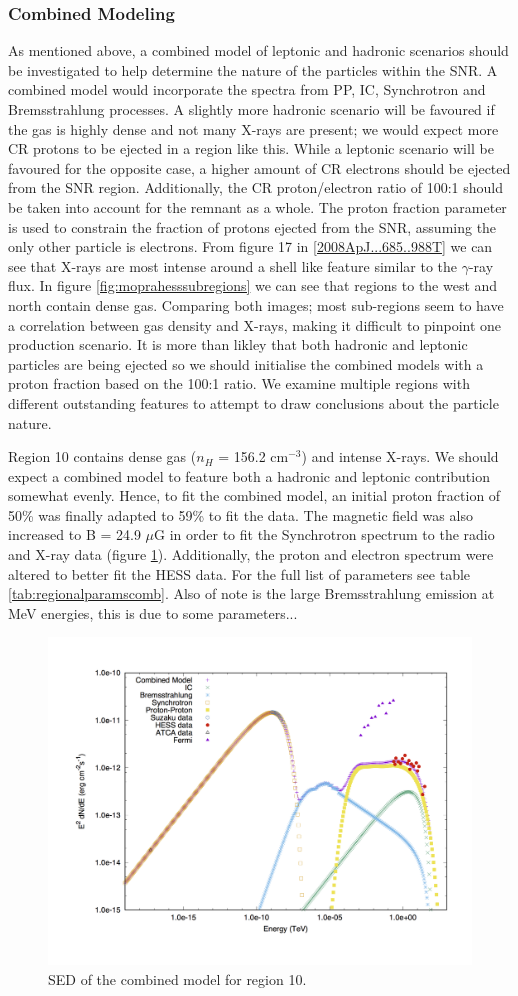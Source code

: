 \documentclass[12pt,a4paper]{article}
\begin{document}
\subsubsection{Combined Modeling}
As mentioned above, a combined model of leptonic and hadronic scenarios should be investigated to help determine the nature of the particles within the SNR. A combined model would incorporate the spectra from PP, IC, Synchrotron and Bremsstrahlung processes. A slightly more hadronic scenario will be favoured if the gas is highly dense and not many X-rays are present; we would expect more CR protons to be ejected in a region like this. While a leptonic scenario will be favoured for the opposite case, a higher amount of CR electrons should be ejected from the SNR region. Additionally, the CR proton/electron ratio of 100:1 should be taken into account for the remnant as a whole. The proton fraction parameter is used to constrain the fraction of protons ejected from the SNR, assuming the only other particle is electrons. From figure 17 in \ref{2008ApJ...685..988T} we can see that X-rays are most intense around a shell like feature similar to the $\gamma$-ray flux. In figure \ref{fig:moprahesssubregions} we can see that regions to the west and north contain dense gas. Comparing both images; most sub-regions seem to have a correlation between gas density and X-rays, making it difficult to pinpoint one production scenario. It is more than likley that both hadronic and leptonic particles are being ejected so we should initialise the combined models with a proton fraction based on the 100:1 ratio. We examine multiple regions with different outstanding features to attempt to draw conclusions about the particle nature. 

Region 10 contains dense gas ($n_H$ = 156.2 cm$^{-3}$) and intense X-rays. We should expect a combined model to feature both a hadronic and leptonic contribution somewhat evenly. Hence, to fit the combined model, an initial proton fraction of 50\% was finally adapted to 59\% to fit the data. The magnetic field was also increased to B = 24.9 $\mu$G in order to fit the Synchrotron spectrum to the radio and X-ray data (figure \ref{fig:rxj1713comb10}). Additionally, the proton and electron spectrum were altered to better fit the HESS data. For the full list of parameters see table \ref{tab:regionalparamscomb}. Also of note is the large Bremsstrahlung emission at MeV energies, this is due to some parameters...
\begin{figure}[H]
	\centering
	\includegraphics[width=0.4\linewidth, height=0.3\textheight, angle=-90]{rxj1713_comb10}
	\caption{SED of the combined model for region 10.}
	\label{fig:rxj1713comb10}
\end{figure}
\end{document}
